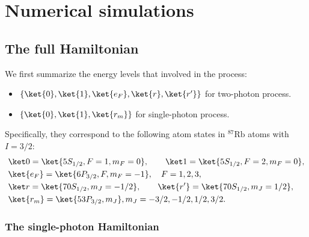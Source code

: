 \chapter{Numerical simulations}


\section{The full Hamiltonian}
We first summarize the energy levels that involved in the process:
\begin{itemize}
    \item $\{\ket{0},\ket{1},\ket{e_F},\ket{r},\ket{r'}\}$ for two-photon process.
    \item $\{\ket{0},\ket{1},\ket{r_m}\}$ for single-photon process.
\end{itemize}

Specifically, they correspond to the following atom states in $^{87}\mathrm{Rb}$ atoms with $I = 3/2$:
\begin{align}
&\ket 0=\ket{5S_{1/2},F=1,m_F=0},\qquad\ket1=\ket{5S_{1/2},F=2,m_F=0},\\
&\ket{e_{F}}=\ket{6P_{3/2},F,m_F=-1},\quad F=1,2,3,\\
&\ket r=\ket{70S_{1/2},m_J=-1/2}, \qquad\ket{r'}=\ket{70S_{1/2},m_J=1/2},\\
&  \ket{r_m}=\ket{53P_{3/2},m_J}, m_J = -3/2,-1/2,1/2,3/2.
\end{align}


\subsection{The single-photon Hamiltonian}

